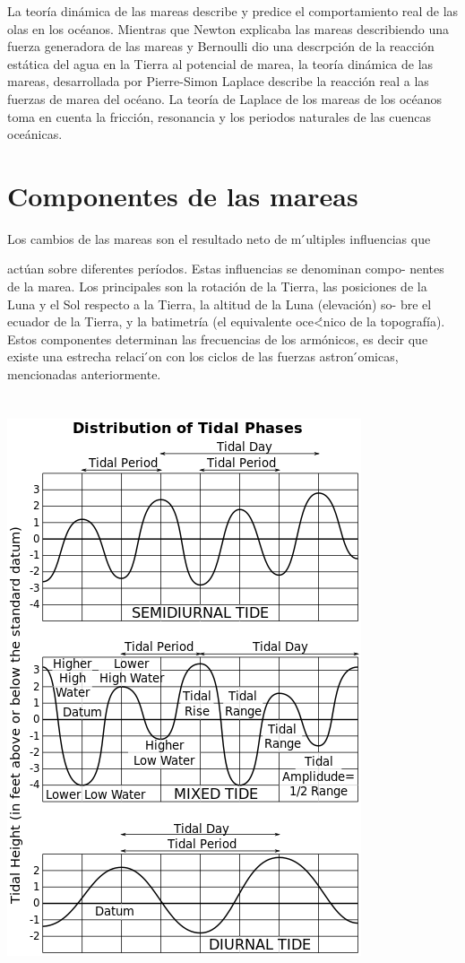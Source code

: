 \documentclass[]{article}
\begin{document}
La teor\'ia din\'amica de las mareas describe y predice el comportamiento real de las olas en los oc\'eanos.
Mientras que Newton explicaba las mareas describiendo una fuerza generadora de las mareas y Bernoulli dio una descrpci\'on de la reacci\'on est\'atica del agua en la Tierra al potencial de marea, la teor\'ia din\'amica de las mareas, desarrollada por Pierre-Simon Laplace describe la reacci\'on real a las fuerzas de marea del oc\'eano. La teor\'ia de Laplace de los mareas de los oc\'eanos toma en cuenta la fricci\'on, resonancia y los periodos naturales de las cuencas oce\'anicas.

\section*{Componentes de las mareas}

Los cambios de las mareas son el resultado neto de m ́ultiples influencias que

act\'uan sobre diferentes per\'iodos. Estas influencias se denominan compo-
nentes de la marea. Los principales son la rotaci\'on de la Tierra, las posiciones
de la Luna y el Sol respecto a la Tierra, la altitud de la Luna (elevaci\'on) so-
bre el ecuador de la Tierra, y la batimetr\'ia (el equivalente oce\'<nico de la topograf\'ia). Estos componentes determinan las frecuencias de los arm\'onicos, es decir que existe una estrecha relaci ́on con los ciclos de las fuerzas astron ́omicas, mencionadas anteriormente.
\\\\\\
\includegraphics[scale=0.5]{Tides}
\end{document}
